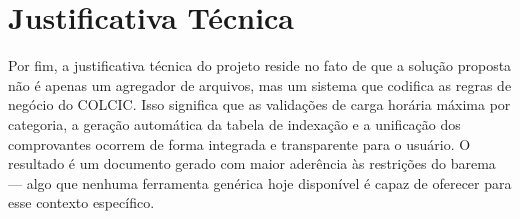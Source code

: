 \section{Justificativa Técnica}

Por fim, a justificativa técnica do projeto reside no fato de que a solução proposta não é apenas um agregador de arquivos, mas um sistema que codifica as regras de negócio do COLCIC. Isso significa que as validações de carga horária máxima por categoria, a geração automática da tabela de indexação e a unificação dos comprovantes ocorrem de forma integrada e transparente para o usuário. O resultado é um documento gerado com maior aderência às restrições do barema — algo que nenhuma ferramenta genérica hoje disponível é capaz de oferecer para esse contexto específico.
